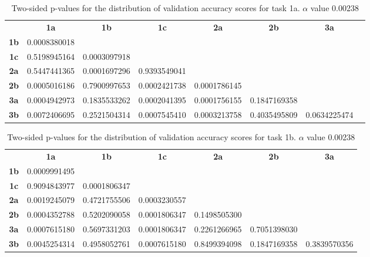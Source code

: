 \begin{table}[h!]
    \centering
    \begin{tabular}{cccccccc}
                              & \textbf{1a}        & \textbf{1b}        & \textbf{1c}        & \textbf{2a}        & \textbf{2b}  & \textbf{3a}  \\
    \textbf{1b}               & 0.0008380018       &                    &                    &                    &              &              \\
    \textbf{1c}               & 0.5198945164       & 0.0003097918       &                    &                    &              &              \\
    \textbf{2a}               & 0.5447441365       & 0.0001697296       & 0.9393549041       &                    &              &              \\
    \textbf{2b}               & 0.0005016186       & 0.7900997653       & 0.0002421738       &  0.0001786145      &              &              \\
    \textbf{3a}               & 0.0004942973       & 0.1835533262       & 0.0002041395       &  0.0001756155      & 0.1847169358 &              \\
    \textbf{3b}               & 0.0072406695       & 0.2521504314       & 0.0007545410       &  0.0003213758      & 0.4035495809 & 0.0634225474 
    \end{tabular}
    \caption[p-table for validation accuracy (task 1a)]{Two-sided p-values for the distribution of validation accuracy scores for task 1a. \(\alpha\) value 0.00238}
    \label{tab:exp2.validation1a}
\end{table}

\begin{table}[h!]
    \centering
    \begin{tabular}{ccccccc}
                & \textbf{1a}        & \textbf{1b}        & \textbf{1c}        & \textbf{2a}  & \textbf{2b}  & \textbf{3a}  \\
    \textbf{1b} & 0.0009991495       &                    &                    &              &              &              \\
    \textbf{1c} & 0.9094843977       & 0.0001806347       &                    &              &              &              \\
    \textbf{2a} & 0.0019245079       & 0.4721755506       & 0.0003230557       &              &              &              \\
    \textbf{2b} & 0.0004352788       & 0.5202090058       & 0.0001806347       & 0.1498505300 &              &              \\
    \textbf{3a} & 0.0007615180       & 0.5697331203       & 0.0001806347       & 0.2261266965 & 0.7051398030 &              \\
    \textbf{3b} & 0.0045254314       & 0.4958052761       & 0.0007615180       & 0.8499394098 & 0.1847169358 & 0.3839570356
    \end{tabular}
    \caption[p-table for validation accuracy (task 1b)]{Two-sided p-values for the distribution of validation accuracy scores for task 1b. \(\alpha\) value 0.00238}
    \label{tab:exp2.validation1b}
\end{table}

